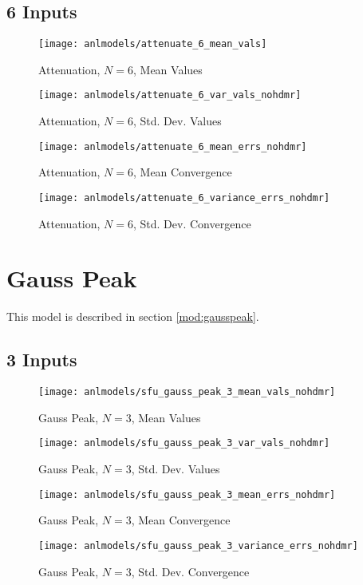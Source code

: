 \subsection{6 Inputs}
\begin{figure}[H]
  \centering
  \texttt{[image: anlmodels/attenuate\_6\_mean\_vals]}
  \caption{Attenuation, $N=6$, Mean Values}
  \label{fig:attenuate mean values 6}
\end{figure}
\begin{figure}[H]
  \centering
  \texttt{[image: anlmodels/attenuate\_6\_var\_vals\_nohdmr]}
  \caption{Attenuation, $N=6$, Std. Dev. Values}
  \label{fig:attenuate var values 6}
\end{figure}

\begin{figure}[H]
  \centering
  \texttt{[image: anlmodels/attenuate\_6\_mean\_errs\_nohdmr]}
  \caption{Attenuation, $N=6$, Mean Convergence}
  \label{fig:attenuate mean errors 6}
\end{figure}
\begin{figure}[H]
  \centering
  \texttt{[image: anlmodels/attenuate\_6\_variance\_errs\_nohdmr]}
  \caption{Attenuation, $N=6$, Std. Dev. Convergence}
  \label{fig:attenuate var errors 6}
\end{figure}


\section{Gauss Peak}
This model is described in section \ref{mod:gausspeak}.
\subsection{3 Inputs}
\begin{figure}[H]
  \centering
  \texttt{[image: anlmodels/sfu\_gauss\_peak\_3\_mean\_vals\_nohdmr]}
  \caption{Gauss Peak, $N=3$, Mean Values}
  \label{fig:gauss peak mean values 3}
\end{figure}
\begin{figure}[H]
  \centering
  \texttt{[image: anlmodels/sfu\_gauss\_peak\_3\_var\_vals\_nohdmr]}
  \caption{Gauss Peak, $N=3$, Std. Dev. Values}
  \label{fig:gauss peak var values 3}
\end{figure}

\begin{figure}[H]
  \centering
  \texttt{[image: anlmodels/sfu\_gauss\_peak\_3\_mean\_errs\_nohdmr]}
  \caption{Gauss Peak, $N=3$, Mean Convergence}
  \label{fig:gauss peak mean errors 3}
\end{figure}
\begin{figure}[H]
  \centering
  \texttt{[image: anlmodels/sfu\_gauss\_peak\_3\_variance\_errs\_nohdmr]}
  \caption{Gauss Peak, $N=3$, Std. Dev. Convergence}
  \label{fig:gauss peak var errors 3}
\end{figure}

